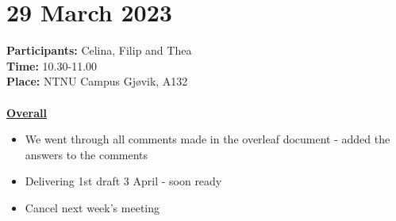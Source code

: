 \section{29 March 2023}
\textbf{Participants:} Celina, Filip and Thea\\
\textbf{Time:} 10.30-11.00 \\
\textbf{Place:} NTNU Campus Gjøvik, A132
\\~\\
\textbf{\underline{Overall}}
\begin{itemize}
    \item We went through all comments made in the overleaf document - added the answers to the comments
    \item Delivering 1st draft 3 April - soon ready
    \item Cancel next week's meeting
\end{itemize}